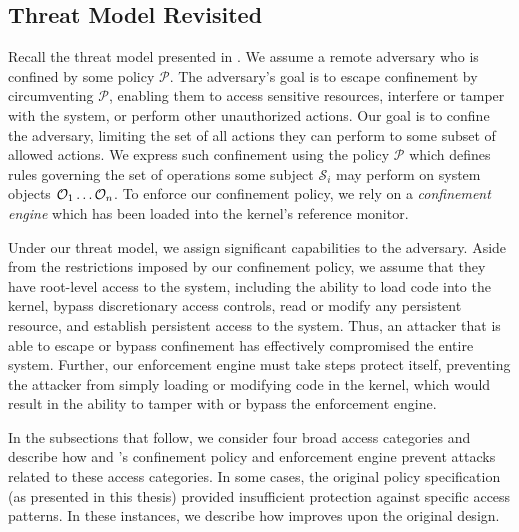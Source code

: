 
\subsection{Threat Model Revisited}

Recall the threat model presented in . We assume a remote
adversary who is confined by some policy $\mathcal{P}$. The adversary's goal is to escape
confinement by circumventing $\mathcal{P}$, enabling them to access sensitive resources,
interfere or tamper with the system, or perform other unauthorized actions. Our goal is to
confine the adversary, limiting the set of all actions they can perform to some subset of
allowed actions. We express such confinement using the policy $\mathcal{P}$ which defines
rules governing the set of operations some subject $\mathcal{S}_i$ may perform on system
objects $\mathcal{O}_1 \mathellipsis \mathcal{O}_n$. To enforce our confinement policy, we
rely on a \textit{confinement engine} which has been loaded into the kernel's reference
monitor.

Under our threat model, we assign significant capabilities to the adversary. Aside from the
restrictions imposed by our confinement policy, we assume that they have root-level access
to the system, including the ability to load code into the kernel, bypass discretionary
access controls, read or modify any persistent resource, and establish persistent access
to the system. Thus, an attacker that is able to escape or bypass confinement has
effectively compromised the entire system. Further, our enforcement engine must take steps
protect itself, preventing the attacker from simply loading or modifying code in the
kernel, which would result in the ability to tamper with or bypass the enforcement engine.

In the subsections that follow, we consider four broad access categories and describe how
\bpfbox{} and \bpfcontain{}'s confinement policy and enforcement engine prevent attacks
related to these access categories. In some cases, the original \bpfbox{} policy
specification (as presented in this thesis) provided insufficient protection against
specific access patterns. In these instances, we describe how \bpfcontain{} improves upon
the original \bpfbox{} design.

